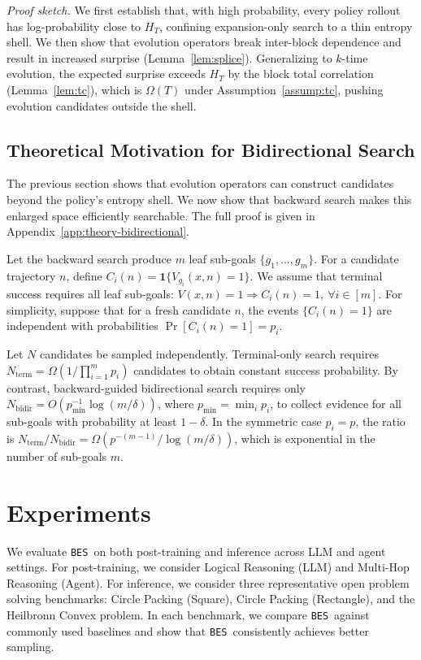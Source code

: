 \documentclass{llmxive}
\providecommand{\ours}{\texttt{BES}}
\begin{document}
\textit{Proof sketch.}
We first establish that, with high probability, every policy rollout has log-probability close to $H_T$, confining expansion-only search to a thin entropy shell. We then show that evolution operators break inter-block dependence and result in increased surprise (Lemma~\ref{lem:splice}). Generalizing to $k$-time evolution, the expected surprise exceeds $H_T$ by the block total correlation (Lemma~\ref{lem:tc}), which is $\Omega(T)$ under Assumption~\ref{assump:tc}, pushing evolution candidates outside the shell.

\subsection{Theoretical Motivation for Bidirectional Search}
\label{sec:theory-bidirectional}

The previous section shows that evolution operators can construct candidates beyond the policy's entropy shell. We now show that backward search makes this enlarged space efficiently searchable. The full proof is given in Appendix~\ref{app:theory-bidirectional}.

Let the backward search produce $m$ leaf sub-goals $\{g_1,\ldots,g_m\}$. For a candidate trajectory $n$, define $C_i(n)=\mathbf{1}\{V_{g_i}(x,n)=1\}$. We assume that terminal success requires all leaf sub-goals: $V(x,n)=1 \Rightarrow C_i(n)=1,\ \forall i\in[m]$. For simplicity, suppose that for a fresh candidate $n$, the events $\{C_i(n)=1\}$ are independent with probabilities $\Pr[C_i(n)=1]=p_i$.

\begin{theorem}
\label{thm:bidir}
Let $N$ candidates be sampled independently. Terminal-only search requires
$N_{\mathrm{term}} = \Omega\!\left(1 / \prod_{i=1}^m p_i\right)$
candidates to obtain constant success probability. By contrast, backward-guided bidirectional search requires only
$N_{\mathrm{bidir}} = O\!\left(p_{\min}^{-1}\log(m/\delta)\right)$,
where $p_{\min}=\min_i p_i$,
to collect evidence for all sub-goals with probability at least $1-\delta$. In the symmetric case $p_i=p$, the ratio is
$N_{\mathrm{term}} / N_{\mathrm{bidir}} = \Omega\!\left(p^{-(m-1)} / \log(m/\delta)\right)$,
which is exponential in the number of sub-goals $m$.
\end{theorem}

\section{Experiments}
We evaluate \ours\ on both post-training and inference across LLM and agent settings. For post-training, we consider Logical Reasoning (LLM) and Multi-Hop Reasoning (Agent). For inference, we consider three representative open problem solving benchmarks: Circle Packing (Square), Circle Packing (Rectangle), and the Heilbronn Convex problem. In each benchmark, we compare \ours\ against commonly used baselines and show that \ours\ consistently achieves better sampling.
\end{document}
